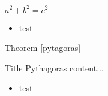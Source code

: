\documentclass{beamer}
\begin{document}
\begin{frame}
    \begin{theorem}[Pythagoras]
        $a^2+b^2=c^2$ 
        \begin{itemize}
        \item test
        \end{itemize}
        \label{pytagoras}
    \end{theorem}

    Theorem \ref{pytagoras}

    \begin{block}{Title Pythagoras}
        content...
        \begin{itemize}
        \item test
        \end{itemize}
    \end{block}
\end{frame} 
\end{document}
